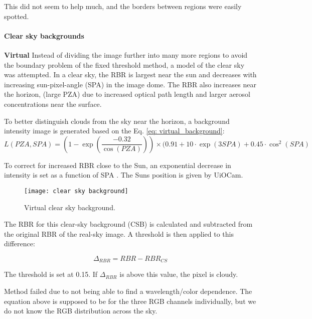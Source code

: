\documentclass[]{book}
\begin{document}
		This did not seem to help much, and the borders between regions were easily spotted.
		
		\paragraph{Clear sky backgrounds}
		\textbf{Virtual}
		Instead of dividing the image further into many more regions to avoid the boundary problem of the fixed threshold method, a model of the clear sky was attempted. In a clear sky, the RBR is largest near the sun and decreases with increasing sun-pixel-angle (SPA) in the image dome. The RBR also increases near the horizon, (large PZA) due to increased optical path length and larger aerosol concentrations near the surface.
		
		To better distinguish clouds from the sky near the horizon, a background intensity image is generated based on the Eq. \ref{eq: virtual_background}:
		\begin{equation}
		\label{eq: virtual_background}
			L(PZA, SPA) = (1 - \exp (\frac{-0.32}{\cos (PZA)}))\times (0.91 + 10\cdot \exp (3SPA) + 0.45\cdot \cos^2 (SPA)
		\end{equation}

		To correct for increased RBR close to the Sun, an exponential decrease in intensity is set as a function of SPA \cite{CHAUVIN20151970}. The Suns position is given by UiOCam.
		
		\begin{figure} [ht]
			\centering
			\texttt{[image: clear sky background]}
			\caption{Virtual clear sky background.}
			\label{fig: clear sky background}
		\end{figure}

		The RBR for this clear-sky background (CSB) is calculated and subtracted from the original RBR of the real-sky image. A threshold is then applied to this difference:

		\begin{equation}
		\label{eq: clear_sky_threshold}
		\Delta_{RBR} = RBR - RBR_{CS} 
		\end{equation}

		The threshold is set at 0.15. If $\Delta_{RBR}$ is above this value, the pixel is cloudy. 
		
		Method failed due to not being able to find a wavelength/color dependence. The equation above is supposed to be for the three RGB channels individually, but we do not know the RGB distribution across the sky.
		
\end{document}
